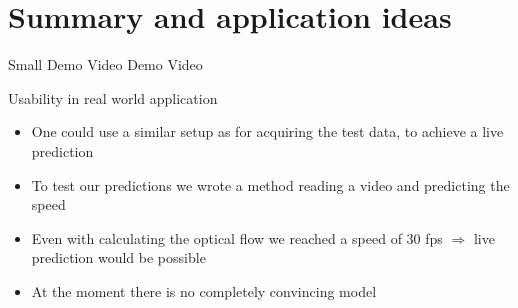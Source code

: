 \section{Summary and application ideas}

\begin{frame}{Small Demo Video}
Demo Video
\end{frame}

\begin{frame}{Usability in real world application}
	\begin{itemize}
		\item One could use a similar setup as for acquiring the test data, to achieve a live prediction
		\item To test our predictions we wrote a method reading a video and predicting the speed
		\item Even with calculating the optical flow we reached a speed of 30 fps $\Rightarrow$ live prediction would be possible
		\item At the moment there is no completely convincing model
	\end{itemize}
\end{frame}